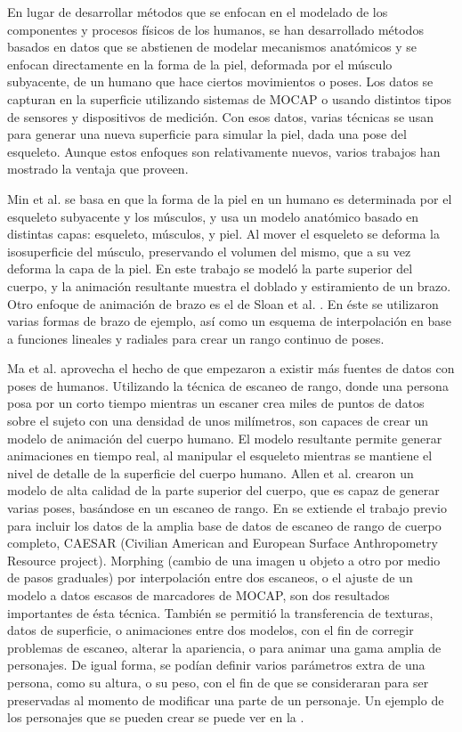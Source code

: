 En lugar de desarrollar métodos que se enfocan en el modelado de los componentes y procesos físicos de los humanos, se han desarrollado métodos basados en datos que se abstienen de modelar mecanismos anatómicos y se enfocan directamente en la forma de la piel, deformada por el músculo subyacente, de un humano que hace ciertos movimientos o poses. Los datos se capturan en la superficie utilizando sistemas de MOCAP o usando distintos tipos de sensores y dispositivos de medición. Con esos datos, varias técnicas se usan para generar una nueva superficie para simular la piel, dada una pose del esqueleto. Aunque estos enfoques son relativamente nuevos, varios trabajos han mostrado la ventaja que proveen.

Min et al. \citep{min2000anatomically} se basa en que la forma de la piel en un humano es determinada por el esqueleto subyacente y los músculos, y usa un modelo anatómico basado en distintas capas: esqueleto, músculos, y piel. Al mover el esqueleto se deforma la isosuperficie del músculo, preservando el volumen del mismo, que a su vez deforma la capa de la piel. En este trabajo se modeló la parte superior del cuerpo, y la animación resultante muestra el doblado y estiramiento de un brazo. Otro enfoque de animación de brazo es el de Sloan et al. \citep{sloan2001shape}. En éste se utilizaron varias formas de brazo de ejemplo, así como un esquema de interpolación en base a funciones lineales y radiales para crear un rango continuo de poses.

Ma et al. \citep{ma2004realistic} aprovecha el hecho de que empezaron a existir más fuentes de datos con poses de humanos. Utilizando la técnica de escaneo de rango, donde una persona posa por un corto tiempo mientras un escaner crea miles de puntos de datos sobre el sujeto con una densidad de unos milímetros, son capaces de crear un modelo de animación del cuerpo humano. El modelo resultante permite generar animaciones en tiempo real, al manipular el esqueleto mientras se mantiene el nivel de detalle de la superficie del cuerpo humano. Allen et al. \citep{allen2002articulated} crearon un modelo de alta calidad de la parte superior del cuerpo, que es capaz de generar varias poses, basándose en un escaneo de rango. En \citep{allen2003space} se extiende el trabajo previo para incluir los datos de la amplia base de datos de escaneo de rango de cuerpo completo, CAESAR (Civilian American and European Surface Anthropometry Resource project). Morphing (cambio de una imagen u objeto a otro por medio de pasos graduales) por interpolación entre dos escaneos, o el ajuste de un modelo a datos escasos de marcadores de MOCAP, son dos resultados importantes de ésta técnica. También se permitió la transferencia de texturas, datos de superficie, o animaciones entre dos modelos, con el fin de corregir problemas de escaneo, alterar la apariencia, o para animar una gama amplia de personajes. De igual forma, se podían definir varios parámetros extra de una persona, como su altura, o su peso, con el fin de que se consideraran para ser preservadas al momento de modificar una parte de un personaje. Un ejemplo de los personajes que se pueden crear se puede ver en la .

